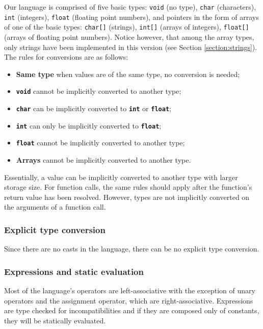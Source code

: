 Our language is comprised of five basic types:
\texttt{void} (no type), 
\texttt{char} (characters),
\texttt{int} (integers),
\texttt{float} (floating point numbers),
and pointers in the form of arrays of one of the basic types:
\texttt{char[]} (strings),
\texttt{int[]} (arrays of integers),
\texttt{float[]} (arrays of floating point numbers). Notice however, that among the array types,
only strings have been implemented in this version (see Section \ref{section:strings}).
The rules for conversions are as follows:

\begin{itemize}
 \item \textbf{Same type} when values are of the same type, no conversion is needed;
 \item \textbf{\texttt{void}} cannot be implicitly converted to another type;
 \item \textbf{\texttt{char}} can be implicitly converted to \textbf{\texttt{int}} or \textbf{\texttt{float}};
 \item \textbf{\texttt{int}} can only be implicitly converted to \textbf{\texttt{float}};
 \item \textbf{\texttt{float}} cannot be implicitly converted to another type;
 \item \textbf{Arrays} cannot be implicitly converted to another type.
\end{itemize}

Essentially, a value can be implicitly converted to another type with larger storage size.
For function calls, the same rules should apply after the function's return value has been
resolved. However, types are not implicitly converted on the arguments of a function call.

\subsubsection{Explicit type conversion}

Since there are no casts in the language, there can be no explicit type conversion.

\subsubsection{Expressions and static evaluation}

Most of the language's operators are left-associative with the exception of unary operators
and the assignment operator, which are right-associative. Expressions are type checked
for incompatibilities and if they are composed only of constants, they will be statically evaluated.


